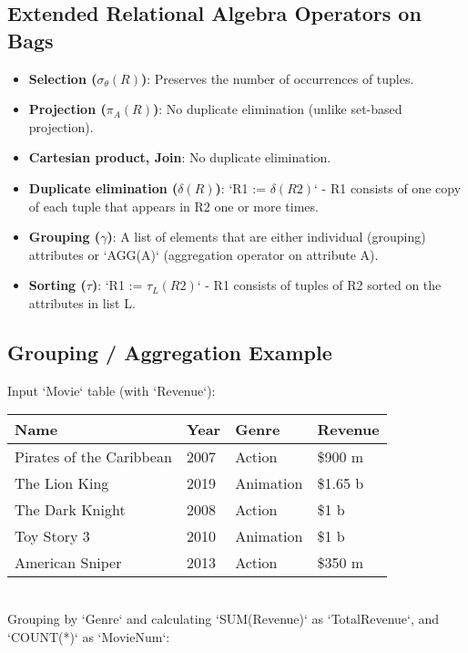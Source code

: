 \documentclass{article}
\newcommand{\sel}{\sigma} %
\newcommand{\proj}{\pi} %
\newcommand{\dupelim}{\delta} %
\newcommand{\group}{\gamma} %
\newcommand{\sort}{\tau} %
\begin{document}
\subsection*{Extended Relational Algebra Operators on Bags} 
\begin{itemize}
    \item \textbf{Selection ($\sel_\theta(R)$)}: Preserves the number of occurrences of tuples. 
    \item \textbf{Projection ($\proj_A(R)$)}: No duplicate elimination (unlike set-based projection). 
    \item \textbf{Cartesian product, Join}: No duplicate elimination. 
    \item \textbf{Duplicate elimination ($\dupelim(R)$)}: `R1 := $\dupelim(R2)$` - R1 consists of one copy of each tuple that appears in R2 one or more times. 
    \item \textbf{Grouping ($\group$)}: A list of elements that are either individual (grouping) attributes or `AGG(A)` (aggregation operator on attribute A). 
    \item \textbf{Sorting ($\sort$)}: `R1 := $\sort_L(R2)$` - R1 consists of tuples of R2 sorted on the attributes in list L. 
\end{itemize}

\subsection*{Grouping / Aggregation Example} 

Input `Movie` table (with `Revenue`):\\

\begin{tabular}{|l|l|l|l|}
    \hline
    \textbf{Name} & \textbf{Year} & \textbf{Genre} & \textbf{Revenue} \\
    \hline
    Pirates of the Caribbean & 2007 & Action & \$900 m \\
    The Lion King & 2019 & Animation & \$1.65 b \\
    The Dark Knight & 2008 & Action & \$1 b \\
    Toy Story 3 & 2010 & Animation & \$1 b \\
    American Sniper & 2013 & Action & \$350 m \\
    \hline
\end{tabular}\\


Grouping by `Genre` and calculating `SUM(Revenue)` as `TotalRevenue`, and `COUNT(*)` as `MovieNum`:\\
\end{document}
